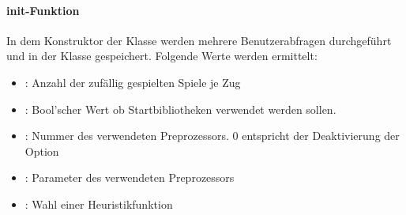 \paragraph{init-Funktion}
In dem Konstruktor der Klasse  werden mehrere Benutzerabfragen durchgeführt und in der Klasse gespeichert. Folgende Werte werden ermittelt:
\begin{itemize}
\item {}: Anzahl der zufällig gespielten Spiele je Zug
\item {}: Bool'scher Wert ob Startbibliotheken verwendet werden sollen.
\item {}: Nummer des verwendeten Preprozessors. 0 entspricht der Deaktivierung der Option
\item {}: Parameter des verwendeten Preprozessors
\item {}: Wahl einer Heuristikfunktion
\end{itemize}

